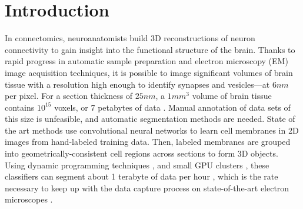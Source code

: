 \section{Introduction}


In connectomics, neuroanatomists build 3D reconstructions of neuron connectivity to gain insight into the functional structure of the brain. Thanks to rapid progress in automatic sample preparation and electron microscopy (EM) image acquisition techniques, it is possible to image significant volumes of brain tissue with a resolution high enough to identify synapses and vesicles---at $6nm$ per pixel. For a section thickness of $25nm$, a $1 mm^3$ volume of brain tissue contains $10^{15}$ voxels, or 7 petabytes of data . Manual annotation of data sets of this size is unfeasible, and automatic segmentation methods are needed. State of the art methods use convolutional neural networks to learn cell membranes in 2D images from hand-labeled training data. Then, labeled membranes are grouped into geometrically-consistent cell regions across sections to form 3D objects. Using dynamic programming techniques , and small GPU clusters , these classifiers can segment about 1 terabyte of data per hour , which is the rate necessary to keep up with the data capture process on state-of-the-art electron microscopes . 

